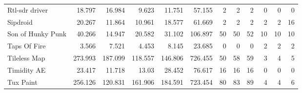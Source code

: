 \begin{table*}[t]
\begin{tabular}{l||r|r|r|r|r||r|r|r||r|r|r}
  Rtl-sdr driver         & 18.797                & 16.984                   & 9.623                      & 11.751                                     & 57.155                                  & 2                           & 2                            & 2                         & 0                           & 0                            & 0                          \\
  Sipdroid               & 20.267                & 11.864                   & 10.961                     & 18.577                                     & 61.669                                  & 2                           & 2                            & 2                         & 2                           & 2                            & 16                         \\
  Son of Hunky Punk      & 40.266                & 14.947                   & 20.582                     & 31.102                                     & 106.897                                 & 50                          & 50                           & 52                        & 10                          & 10                           & 10                         \\
  Taps Of Fire           & 3.566                 & 7.521                    & 4.453                      & 8.145                                      & 23.685                                  & 0                           & 0                            & 0                         & 2                           & 2                            & 2                          \\
  Tileless Map           & 273.993               & 187.099                  & 118.557                    & 146.806                                    & 726.455                                 & 50                          & 58                           & 59                        & 3                           & 4                            & 5                          \\
  Timidity AE            & 23.417                & 11.718                   & 13.03                      & 28.452                                     & 76.617                                  & 16                          & 16                           & 16                        & 0                           & 0                            & 0                          \\
  Tux Paint              & 256.126               & 120.831                  & 161.906                    & 184.591                                    & 723.454                                 & 80                          & 83                           & 89                        & 4                           & 4                            & 6                          \\

\end{tabular}
\end{table*}
